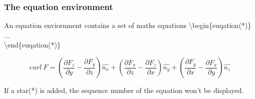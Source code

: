 \documentclass{beamer}
\begin{document}
\begin{frame}

\end{frame}

\begin{frame}
	\frametitle{The equation environment}
	\begin{definition}
		An {\color{blue}equation} enviornment contains a set of maths equations
		{\color{red}\textbackslash begin\{euqation(*)\}}\\
		\quad ...\\
		{\color{red}\textbackslash end\{euqation(*)\}}\\
	\end{definition}
	\begin{example}
		\begin{equation}
		curl\ F=\left(\frac{\partial F_z}{\partial y}-\frac{\partial F_y}{\partial z}\right)\hat{n_x}+\left(\frac{\partial F_x}{\partial z}-\frac{\partial F_z}{\partial x}\right)\hat{n_y}+\left(\frac{\partial F_y}{\partial x}-\frac{\partial F_x}{\partial y}\right)\hat{n_z}
		\end{equation}
	\end{example}
	If a star({\color{blue}*}) is added, the sequence number of the equation won't be displayed.
\end{frame}
\end{document}
